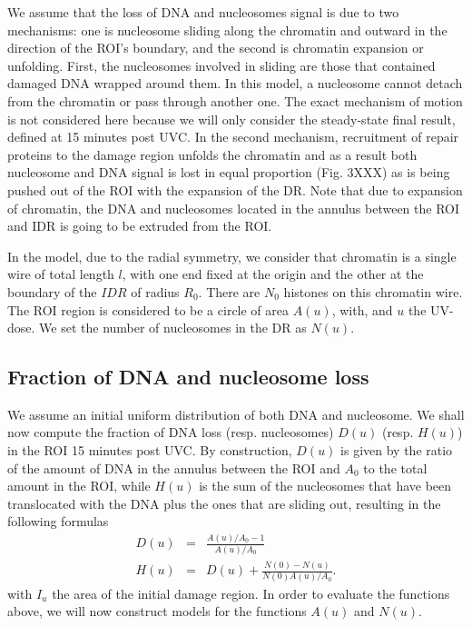 \documentclass[12pt]{article}
\begin{document}
We assume that the loss of DNA and nucleosomes signal is due to two mechanisms: one is nucleosome sliding along the chromatin and outward in the direction of the ROI's boundary, and the second is chromatin expansion or unfolding. First, the nucleosomes involved in sliding are those that contained damaged DNA wrapped around them. In this model, a nucleosome cannot detach from the chromatin or pass through another one. The exact mechanism of motion is not considered here because we will only consider the steady-state final result, defined at 15 minutes post UVC. In the second mechanism, recruitment of repair proteins to the damage region unfolds the chromatin and as a result  both nucleosome and DNA signal is lost in equal proportion (Fig. 3XXX) as is being pushed out of the ROI with the expansion of the DR. Note that due to expansion of chromatin, the DNA and nucleosomes located in the annulus between the ROI and IDR is going to be extruded from the ROI.

In the model, due to the radial symmetry, we consider that chromatin is a single wire of total length $l$, with one end fixed at the origin and the other at the boundary of the $IDR$ of radius $R_0$. There are $N_0$ histones on this chromatin wire.  The ROI region is considered to be a circle of area $A(u)$, with, and $u$ the UV-dose. We set the number of nucleosomes in the DR as $N(u)$.

\subsection{Fraction of DNA and nucleosome loss }\label{subsection:fractionOfDNAandNucleosomeLoss}
We assume an initial uniform distribution of both DNA and nucleosome. 
We shall now compute the fraction of DNA loss (resp. nucleosomes) $D(u)$ (resp. $H(u)$) in the ROI 15 minutes post UVC. By construction, $D(u)$ is given by the ratio of the amount of DNA in the annulus between the ROI and $A_0$ to the total amount in the ROI, while $H(u)$ is the sum of the nucleosomes that have been translocated with the DNA plus the ones that are sliding out, resulting in the following formulas
\begin{eqnarray*}
D(u)&=& \frac{A(u)/A_0 -1}{A(u)/A_0} \\
H(u)&=&D(u)+\frac{N(0)-N(u)}{N(0)A(u)/A_0}.
\end{eqnarray*}
with $I_u$ the area of the initial damage region.
In order to evaluate the functions above, we will now construct models for the functions $A(u)$ and $N(u)$.
\end{document}

